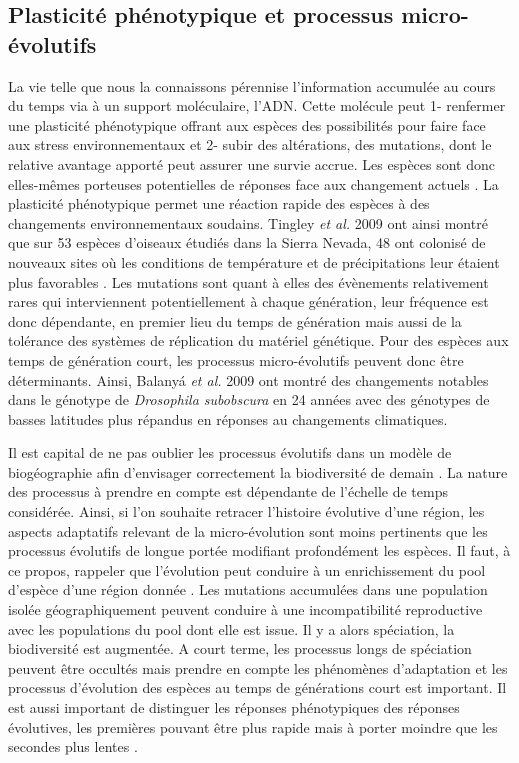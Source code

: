 \subsection*{Plasticité phénotypique et processus
micro-évolutifs}\label{plasticituxe9-phuxe9notypique-et-processus-micro-uxe9volutifs}

La vie telle que nous la connaissons pérennise l'information accumulée
au cours du temps via à un support moléculaire, l'ADN. Cette molécule
peut 1- renfermer une plasticité phénotypique offrant aux espèces des
possibilités pour faire face aux stress environnementaux et 2- subir des
altérations, des mutations, dont le relative avantage apporté peut
assurer une survie accrue. Les espèces sont donc elles-mêmes porteuses
potentielles de réponses face aux changement actuels
\cite{Parmesan2006,Lavergne2010}. La plasticité phénotypique permet une
réaction rapide des espèces à des changements environnementaux soudains.
Tingley \textit{et al.} 2009 ont ainsi montré que sur 53 espèces
d'oiseaux étudiés dans la Sierra Nevada, 48 ont colonisé de nouveaux
sites où les conditions de température et de précipitations leur étaient
plus favorables \cite{Tingley2009}. Les mutations sont quant à elles des
évènements relativement rares qui interviennent potentiellement à chaque
génération, leur fréquence est donc dépendante, en premier lieu du temps
de génération mais aussi de la tolérance des systèmes de réplication du
matériel génétique. Pour des espèces aux temps de génération court, les
processus micro-évolutifs peuvent donc être déterminants. Ainsi, Balanyá
\textit{et al.} 2009 ont montré des changements notables dans le
génotype de \textit{Drosophila subobscura} en 24 années avec des
génotypes de basses latitudes plus répandus en réponses au changements
climatiques.

Il est capital de ne pas oublier les processus évolutifs dans un modèle
de biogéographie afin d'envisager correctement la biodiversité de demain
\cite{Sexton2009,Lavergne2010}. La nature des processus à prendre en
compte est dépendante de l'échelle de temps considérée. Ainsi, si l'on
souhaite retracer l'histoire évolutive d'une région, les aspects
adaptatifs relevant de la micro-évolution sont moins pertinents que les
processus évolutifs de longue portée modifiant profondément les espèces.
Il faut, à ce propos, rappeler que l'évolution peut conduire à un
enrichissement du pool d'espèce d'une région donnée
\cite{Rosindell2011,MacArthur1967}. Les mutations accumulées dans une
population isolée géographiquement peuvent conduire à une
incompatibilité reproductive avec les populations du pool dont elle est
issue. Il y a alors spéciation, la biodiversité est augmentée. A court
terme, les processus longs de spéciation peuvent être occultés mais
prendre en compte les phénomènes d'adaptation et les processus
d'évolution des espèces au temps de générations court est important. Il
est aussi important de distinguer les réponses phénotypiques des
réponses évolutives, les premières pouvant être plus rapide mais à
porter moindre que les secondes plus lentes \cite{Gienapp2008}.

